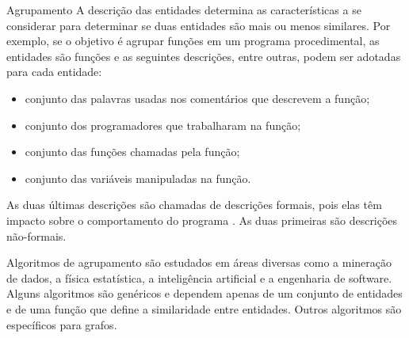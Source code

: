 \begin{section}{Agrupamento}
A descrição das entidades determina as características a se considerar para determinar se duas entidades são mais ou menos similares. Por exemplo, se o objetivo é agrupar funções em um programa procedimental, as entidades são funções e as seguintes descrições, entre outras, podem ser adotadas para cada entidade:

\begin{itemize}
	\item conjunto das palavras usadas nos comentários que descrevem a função;
	\item conjunto dos programadores que trabalharam na função;
	\item conjunto das funções chamadas pela função;
	\item conjunto das variáveis manipuladas na função.
\end{itemize}

As duas últimas descrições são chamadas de descrições formais, pois elas têm impacto sobre o comportamento do programa \cite{Anquetil1999}. As duas primeiras são descrições não-formais. 

Algoritmos de agrupamento são estudados em áreas diversas como a mineração de dados, a física estatística, a inteligência artificial e a engenharia de software. Alguns algoritmos são genéricos e dependem apenas de um conjunto de entidades e de uma função que define a similaridade entre entidades. Outros algoritmos são específicos para grafos.

\end{section}

